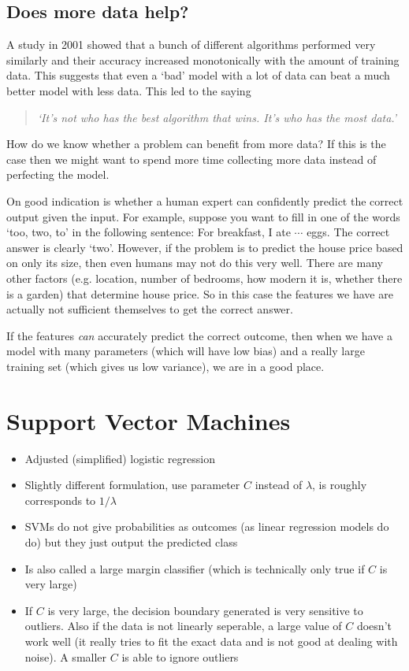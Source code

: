 \documentclass[a4paper, 10pt,hidelinks]{article}
\begin{document}
\subsection{Does more data help?}

A study in 2001 showed that a bunch of different algorithms performed very similarly and their accuracy increased monotonically with the amount of training data. This suggests that even a `bad' model with a lot of data can beat a much better model with less data. This led to the saying 

\blockquote{\emph{`It's not who has the best algorithm that wins. It's who has the most data.'}}

 How do we know whether a problem can benefit from more data? If this is the case then we might want to spend more time collecting more data instead of perfecting the model.

On good indication is whether a human expert can confidently predict the correct output given the input. For example, suppose you want to fill in one of the words `too, two, to' in the following sentence: For breakfast, I ate $\cdots$ eggs. The correct answer is clearly `two'. However, if the problem is to predict the house price based on only its size, then even humans may not do this very well. There are many other factors (e.g. location, number of bedrooms, how modern it is, whether there is a garden) that determine house price. So in this case the features we have are actually not sufficient themselves to get the correct answer. 

If the features \emph{can} accurately predict the correct outcome, then  when we have a model with many parameters (which will have low bias) and a really large training set (which gives us low variance), we are in a good place. 

\section{Support Vector Machines}

\begin{itemize}
\item Adjusted (simplified) logistic regression
\item Slightly different formulation, use parameter $C$ instead of $\lambda$, is roughly corresponds to $1/\lambda$
\item SVMs do not give probabilities as outcomes (as linear regression models do do) but they just output the predicted class
\item Is also called a large margin classifier (which is technically only true if $C$ is very large)
\item If $C$ is very large, the decision boundary generated is very sensitive to outliers. Also if the data is not linearly seperable, a large value of $C$ doesn't work well (it really tries to fit the exact data and is not good at dealing with noise). A smaller $C$ is able to ignore outliers
\end{itemize}
\end{document}
